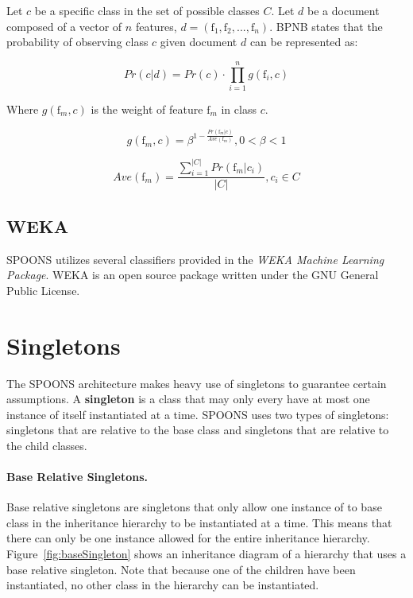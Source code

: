 \documentclass[12pt]{ucthesis}
\begin{document}
Let $c$ be a specific class in the set of possible classes $C$.
Let $d$ be a document composed of a vector of $n$ features, $d = (\textrm{f}_{1}, \textrm{f}_{2}, ..., \textrm{f}_{n})$.
BPNB states that the probability of observing class $c$ given document $d$
can be represented as:

\begin{equation}
   Pr(c|d) = Pr(c) \cdot \prod_{i = 1}^{n}g(\textrm{f}_{i},c)
\end{equation}

Where $g(\textrm{f}_{m}, c)$ is the weight of feature $\textrm{f}_m$ in class $c$.

\begin{equation}
   g(\textrm{f}_m, c) = \beta^{1 - \frac{Pr(\textrm{f}_m|c)}{Ave(\textrm{f}_m)}}, 0 < \beta < 1
\end{equation}

\begin{equation}
   Ave(\textrm{f}_m) = \frac{\sum_{i=1}^{|C|} Pr(\textrm{f}_m|c_{i})}{|C|}, c_i \in C
\end{equation}

\subsection{WEKA}
\label{background-weka}
SPOONS utilizes several classifiers provided in the \textit{WEKA Machine Learning Package}.
WEKA is an open source package written under the GNU General Public License\cite{weka}.

\section{Singletons}
\label{background-singletons}
The SPOONS architecture makes heavy use of singletons to guarantee certain assumptions.
A \textbf{singleton} is a class that may only every have at most one instance of itself instantiated at a time.
SPOONS uses two types of singletons: singletons that are relative to the base class and singletons that are relative to the
child classes.

\paragraph{Base Relative Singletons.}
Base relative singletons are singletons that only allow one instance of to base class in the inheritance hierarchy to be instantiated
at a time. This means that there can only be one instance allowed for the entire inheritance hierarchy.
Figure~\ref{fig:baseSingleton} shows an inheritance diagram of a hierarchy that uses a base relative singleton.
Note that because one of the children have been instantiated, no other class in the hierarchy can be instantiated.
\end{document}
